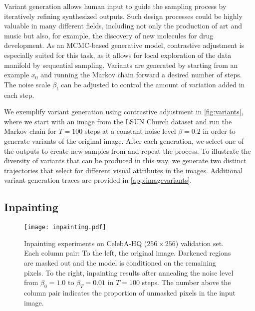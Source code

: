 \documentclass[10pt,twocolumn,letterpaper]{article}
\begin{document}
Variant generation allows human input to guide the sampling process by iteratively refining synthesized outputs.
Such design processes could be highly valuable in many different fields, including not only the production of art and music but also, for example, the discovery of new molecules for drug development.
As an MCMC-based generative model, contrastive adjustment is especially suited for this task, as it allows for local exploration of the data manifold by sequential sampling.
Variants are generated by starting from an example $x_{0}$ and running the Markov chain forward a desired number of steps.
The noise scale $\beta_{t}$ can be adjusted to control the amount of variation added in each step.

We exemplify variant generation using contrastive adjustment in \cref{fig:variants}, where we start with an image from the LSUN Church dataset and run the Markov chain for $T=100$ steps at a constant noise level $\beta = 0.2$ in order to generate variants of the original image.
After each generation, we select one of the outputs to create new samples from and repeat the process.
To illustrate the diversity of variants that can be produced in this way, we generate two distinct trajectories that select for different visual attributes in the images.
Additional variant generation traces are provided in \cref{app:imagevariants}.


\subsection{Inpainting}

\begin{figure}[t]
  \centering
  \texttt{[image: inpainting.pdf]}\caption{Inpainting experiments on CelebA-HQ ($256 \times 256$) validation set.
    Each column pair:
    To the left, the original image.
    Darkened regions are masked out and the model is conditioned on the remaining pixels.
    To the right, inpainting results after annealing the noise level from $\beta_{0}=1.0$ to $\beta_{T}=0.01$ in $T=100$ steps.
    The number above the column pair indicates the proportion of unmasked pixels in the input image.
  }\label{fig:inpainting}
\end{figure}
\end{document}
